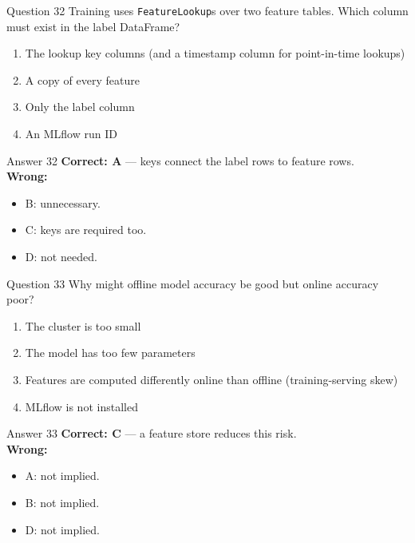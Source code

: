 \documentclass[aspectratio=169,11pt]{beamer}
\begin{document}
\begin{frame}{Question 32}
Training uses \texttt{FeatureLookup}s over two feature tables. Which column must exist in the label DataFrame?
\begin{enumerate}[label=\Alph*.]
\item The lookup key columns (and a timestamp column for point-in-time lookups)
\item A copy of every feature
\item Only the label column
\item An MLflow run ID
\end{enumerate}
\end{frame}
\begin{frame}{Answer 32}
\textbf{Correct: A} --- keys connect the label rows to feature rows.\\
\vspace{0.5em}
\textbf{Wrong:}
\begin{itemize}
\item B: unnecessary.
\item C: keys are required too.
\item D: not needed.
\end{itemize}
\end{frame}

\begin{frame}{Question 33}
Why might offline model accuracy be good but online accuracy poor?
\begin{enumerate}[label=\Alph*.]
\item The cluster is too small
\item The model has too few parameters
\item Features are computed differently online than offline (training-serving skew)
\item MLflow is not installed
\end{enumerate}
\end{frame}
\begin{frame}{Answer 33}
\textbf{Correct: C} --- a feature store reduces this risk.\\
\vspace{0.5em}
\textbf{Wrong:}
\begin{itemize}
\item A: not implied.
\item B: not implied.
\item D: not implied.
\end{itemize}
\end{frame}
\end{document}
